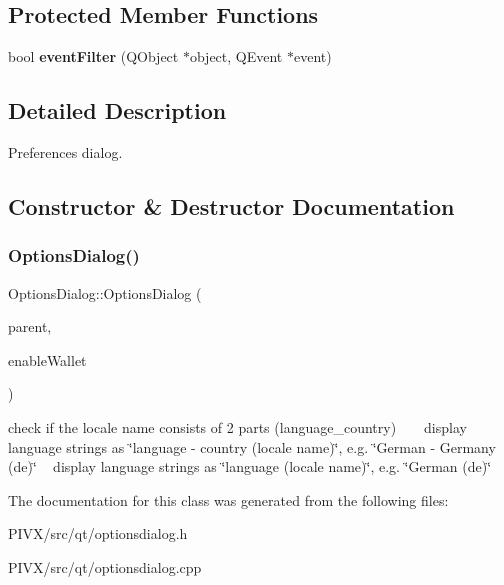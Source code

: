 \subsection*{Protected Member Functions}
\begin{DoxyCompactItemize}
\item 
\mbox{\label{class_options_dialog_abf2b8046ca9bce3f2c1f04e329468983}} 
bool {\bfseries event\+Filter} (Q\+Object $\ast$object, Q\+Event $\ast$event)
\end{DoxyCompactItemize}


\subsection{Detailed Description}
Preferences dialog. 

\subsection{Constructor \& Destructor Documentation}
\mbox{\label{class_options_dialog_ac74fd1c2837d30f6687cb1898d99f8d1}} 
\subsubsection{\texorpdfstring{Options\+Dialog()}{OptionsDialog()}}
{\footnotesize\ttfamily Options\+Dialog\+::\+Options\+Dialog (\begin{DoxyParamCaption}\item[{Q\+Widget $\ast$}]{parent,  }\item[{bool}]{enable\+Wallet }\end{DoxyParamCaption})\hspace{0.3cm}{\ttfamily [explicit]}}

check if the locale name consists of 2 parts (language\+\_\+country) ~\newline
~\newline
 display language strings as \char`\"{}language -\/ country (locale name)\char`\"{}, e.\+g. \char`\"{}\+German -\/ Germany (de)\char`\"{} ~\newline
 display language strings as \char`\"{}language (locale name)\char`\"{}, e.\+g. \char`\"{}\+German (de)\char`\"{} 

The documentation for this class was generated from the following files\+:\begin{DoxyCompactItemize}
\item 
P\+I\+V\+X/src/qt/optionsdialog.\+h\item 
P\+I\+V\+X/src/qt/optionsdialog.\+cpp\end{DoxyCompactItemize}
